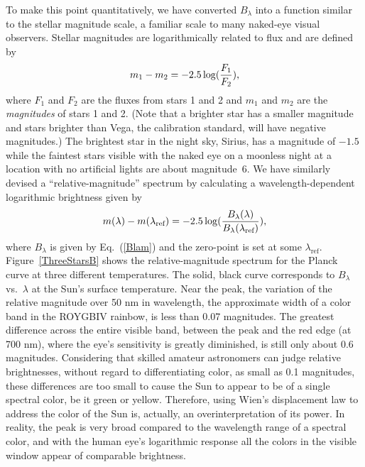 \documentclass[12pt,aps,prb,preprint]{revtex4}   %
\begin{document}
To make this point quantitatively, we have converted $B_\lambda$ into a function similar to the stellar magnitude scale, a familiar scale to many naked-eye visual observers.  Stellar magnitudes are logarithmically related to flux and are defined by 
\begin{equation}
m_1 - m_2 = -2.5 \log({F_1 \over F_2}),
\end{equation}
where $F_1$ and $F_2$ are the fluxes from stars 1 and 2 and $m_1$ and $m_2$ are the {\it magnitudes} of stars 1 and 2.  (Note that a brighter star has a smaller magnitude and stars brighter than Vega, the calibration standard, will have negative magnitudes.)  The brightest star in the night sky, Sirius, has a magnitude of $-1.5$ while the faintest stars visible with the naked eye on a moonless night at a location with no artificial lights are about magnitude~6.
We have similarly devised a ``relative-magnitude'' spectrum by calculating a wavelength-dependent logarithmic brightness given by
\begin{equation}
m(\lambda)- m(\lambda_\textrm{ref}) = -2.5  \log({B_\lambda(\lambda) \over B_\lambda(\lambda_\textrm{ref})}),
\end{equation}
where $B_\lambda$ is given by Eq.~(\ref{Blam}) and the zero-point is set at some $\lambda_\textrm{ref}$.\cite{Vega}
Figure~\ref{ThreeStarsB} shows the relative-magnitude spectrum for the Planck curve at three different temperatures.  The solid, black curve corresponds to 
$B_\lambda$ vs.\ $\lambda$ at the Sun's surface temperature.  Near the peak, the variation of the relative magnitude over 50 nm in wavelength, the approximate width of a color band in the ROYGBIV rainbow, 
is less than 0.07 magnitudes. 
The greatest difference across the entire visible band, between the peak and the red edge (at 700 nm), where the eye's sensitivity is greatly diminished, is still only about 0.6 magnitudes.  Considering that skilled amateur astronomers can judge relative brightnesses, without regard to differentiating color, as small as 0.1 magnitudes, these differences are too small to cause the Sun to appear to be of a single spectral color, be it green or yellow.  Therefore, using Wien's displacement law to address the color of the Sun is, actually, an overinterpretation of its power.  In reality, the peak is very broad compared to the wavelength range of a spectral color, and with the human eye's logarithmic response all the colors in the visible window appear of comparable brightness.
\end{document}

